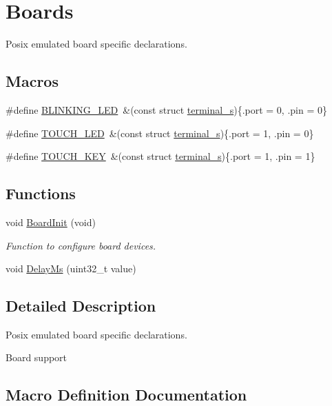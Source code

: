 \hypertarget{group__boards}{}\section{Boards}
\label{group__boards}


Posix emulated board specific declarations.  


\subsection*{Macros}
\begin{DoxyCompactItemize}
\item 
\#define \hyperlink{group__boards_ga7df8b8faeffb332d3a85829727f6e3f3}{B\+L\+I\+N\+K\+I\+N\+G\+\_\+\+L\+ED}~\&(const struct \hyperlink{structterminal__s}{terminal\+\_\+s})\{.port = 0, .pin = 0\}
\item 
\#define \hyperlink{group__boards_ga11baf524276151957e8037eaed95b162}{T\+O\+U\+C\+H\+\_\+\+L\+ED}~\&(const struct \hyperlink{structterminal__s}{terminal\+\_\+s})\{.port = 1, .pin = 0\}
\item 
\#define \hyperlink{group__boards_ga622f361da595a38bbb742894f48f7339}{T\+O\+U\+C\+H\+\_\+\+K\+EY}~\&(const struct \hyperlink{structterminal__s}{terminal\+\_\+s})\{.port = 1, .pin = 1\}
\end{DoxyCompactItemize}
\subsection*{Functions}
\begin{DoxyCompactItemize}
\item 
void \hyperlink{group__boards_gad24575a3bcf2c2433e7720830d813e64}{Board\+Init} (void)
\begin{DoxyCompactList}\small\item\em Function to configure board devices. \end{DoxyCompactList}\item 
void \hyperlink{group__boards_gace922d758774792e0573b7c568fe2a3f}{Delay\+Ms} (uint32\+\_\+t value)
\end{DoxyCompactItemize}


\subsection{Detailed Description}
Posix emulated board specific declarations. 

Board support 

\subsection{Macro Definition Documentation}
\mbox{\label{group__boards_ga7df8b8faeffb332d3a85829727f6e3f3}} 
